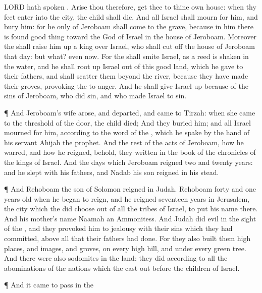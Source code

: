{{{LORD}} hath
spoken
{}.
Arise thou therefore,
get thee to thine own
house:
{} when thy
feet
enter into the
city, the
child shall
die.
And all
Israel shall
mourn for him, and
bury him: for he only of
Jeroboam shall
come to the
grave, because in him there is
found
{}
good
thing toward the
{}
God of
Israel in the
house of
Jeroboam.
Moreover the
{} shall raise him
up a
king over
Israel, who shall cut
off the
house of
Jeroboam that
day: but what? even now.
For the
{} shall
smite
Israel, as a
reed is
shaken in the
water, and he shall root
up
Israel out of this
good
land, which he
gave to their
fathers, and shall
scatter them
beyond the
river, because they have
made their
groves, provoking the
{} to
anger.
And he shall
give
Israel
up
because of the
sins of
Jeroboam, who did
sin, and who made
Israel to
sin.
\par }{\PP {}¶ And
Jeroboam’s
wife
arose, and
departed, and
came to
Tirzah:
{} when she
came to the
threshold of the
door, the
child
died;
And they
buried him; and all
Israel
mourned for him, according to the
word of the
{}, which he
spake by the
hand of his
servant
Ahijah the
prophet.
And the
rest of the
acts of
Jeroboam, how he
warred, and how he
reigned, behold, they
{}
written in the
book of the
chronicles of the
kings of
Israel.
And the
days which
Jeroboam
reigned
{}
two and
twenty
years: and he
slept with his
fathers, and
Nadab his
son
reigned in his stead.
\par }{\PP {}¶ And
Rehoboam the
son of
Solomon
reigned in
Judah.
Rehoboam
{}
forty and
one
years
old when he began to
reign, and he
reigned
seventeen
years in
Jerusalem, the
city which the
{} did
choose out of all the
tribes of
Israel, to
put his
name there. And his
mother’s
name
{}
Naamah an
Ammonitess.
And
Judah
did
evil in the
sight of the
{}, and they provoked him to
jealousy with their
sins which they had
committed, above all that their
fathers had
done.
For they also
built them high
places, and
images, and
groves, on every
high
hill, and under every
green
tree.
And there were also
sodomites in the
land:
{} they
did according to all the
abominations of the
nations which the
{} cast
out
before the
children of
Israel.
\par }{\PP {}¶ And it came to pass in the
}
